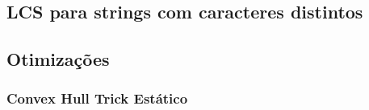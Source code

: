 \subsection{LCS para strings com caracteres distintos}


\subsection{Otimizações}

\subsubsection{Convex Hull Trick Estático}

